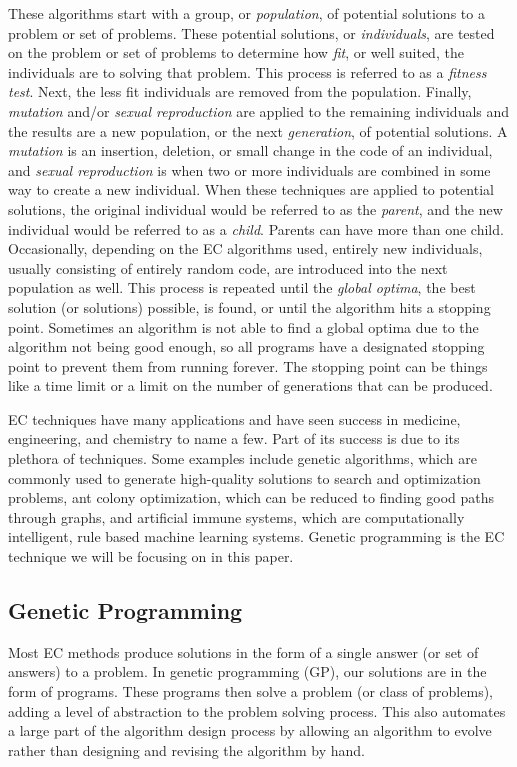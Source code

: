 \documentclass{sig-alternate}
\begin{document}
These algorithms start with a group, or \textit{population}, of potential solutions to a problem or set of problems. These potential solutions, or \textit{individuals}, are tested on the problem or set of problems to determine how \textit{fit}, or well suited, the individuals are to solving that problem. This process is referred to as a \textit{fitness test}. Next, the less fit individuals are removed from the population. Finally, \textit{mutation} and/or \textit{sexual reproduction} are applied to the remaining individuals and the results are a new population, or the next \textit{generation}, of potential solutions. A \textit{mutation} is an insertion, deletion, or small change in the code of an individual, and \textit{sexual reproduction} is when two or more individuals are combined in some way to create a new individual. When these techniques are applied to potential solutions, the original individual would be referred to as the \textit{parent}, and the new individual would be referred to as a \textit{child}. Parents can have more than one child. Occasionally, depending on the EC algorithms used, entirely new individuals, usually consisting of entirely random code, are introduced into the next population as well. This process is repeated until the \textit{global optima}, the best solution (or solutions) possible, is found, or until the algorithm hits a stopping point. Sometimes an algorithm is not able to find a global optima due to the algorithm not being good enough, so all programs have a designated stopping point to prevent them from running forever. The stopping point can be things like a time limit or a limit on the number of generations that can be produced.

EC techniques have many applications and have seen success in medicine, engineering, and chemistry to name a few. Part of its success is due to its plethora of techniques. Some examples include genetic algorithms, which are commonly used to generate high-quality solutions to search and optimization problems, ant colony optimization, which can be reduced to finding good paths through graphs, and artificial immune systems, which are computationally intelligent, rule based machine learning systems. Genetic programming is the EC technique we will be focusing on in this paper.

\subsection{Genetic Programming}
\label{sec:GP}
Most EC methods produce solutions in the form of a single answer (or set of answers) to a problem. In genetic programming (GP), our solutions are in the form of programs. These programs then solve a problem (or class of problems), adding a level of abstraction to the problem solving process. 
This also automates a large part of the algorithm design process by allowing an algorithm to evolve rather than designing and revising the algorithm by hand.
\end{document}
